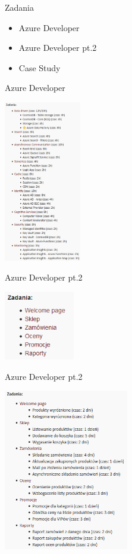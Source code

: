 \documentclass{beamer}
\begin{document}
\begin{frame}{Zadania}
	\begin{huge}
		\begin{itemize}
			\item Azure Developer
			\item Azure Developer pt.2
			\item Case Study
		\end{itemize}
	\end{huge}
\end{frame}

\begin{frame}{Azure Developer}
	\begin{center}
		\includegraphics[height=7cm]{azure_developer2.png}
	\end{center}
\end{frame}

\begin{frame}{Azure Developer pt.2}
	\begin{center}
		\includegraphics[height=3cm]{azure_developer_pt2.png}
	\end{center}
\end{frame}

\begin{frame}{Azure Developer pt.2}
	\begin{center}
		\includegraphics[height=7cm]{azure_developer_pt2_2.png}
	\end{center}
\end{frame}
\end{document}
